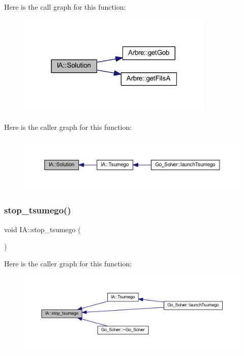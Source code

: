 Here is the call graph for this function\+:
\nopagebreak
\begin{figure}[H]
\begin{center}
\leavevmode
\includegraphics[width=265pt]{class_i_a_a8113a453920dfbee224ae38a6367e059_cgraph}
\end{center}
\end{figure}
Here is the caller graph for this function\+:
\nopagebreak
\begin{figure}[H]
\begin{center}
\leavevmode
\includegraphics[width=350pt]{class_i_a_a8113a453920dfbee224ae38a6367e059_icgraph}
\end{center}
\end{figure}
\mbox{\label{class_i_a_a61a236c15bade2bb202d2f6e25825894}} 
\subsubsection{\texorpdfstring{stop\+\_\+tsumego()}{stop\_tsumego()}}
{\footnotesize\ttfamily void I\+A\+::stop\+\_\+tsumego (\begin{DoxyParamCaption}{ }\end{DoxyParamCaption})\hspace{0.3cm}{\ttfamily [static]}}

Here is the caller graph for this function\+:
\nopagebreak
\begin{figure}[H]
\begin{center}
\leavevmode
\includegraphics[width=350pt]{class_i_a_a61a236c15bade2bb202d2f6e25825894_icgraph}
\end{center}
\end{figure}
\mbox{\label{class_i_a_a364aef554d81e9a93bff08c28d437497}} 

